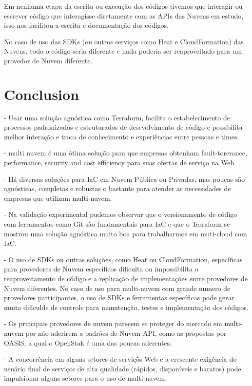 \documentclass[12pt]{article}
\begin{document}
	Em nenhuma etapa da escrita ou execução dos códigos tivemos que interagir ou escrever código que interagisse diretamente com as APIs das Nuvens em estudo, isso nos facilitou a escrita e documentação dos códigos.
	
	No caso de uso das SDKs (ou outros serviços como Heat e CloudFormation) das Nuvens, todo o código seria diferente e nada poderia ser reaproveitado para um provedor de Nuvem diferente. 		
	
	\section{Conclusion}
	
	- Usar uma solução agnóstica como Terraform, facilita o estabelecimento de processos padronizados e estruturados de desevolvimento de código e possibilita melhor interação e troca de conhecimento e experiências entre pessoas e times.
	
	- multi nuvem é uma ótima solução para que empresas obtenham fault-torerance, performance, security and cost efficiency para suas ofertas de serviço na Web.
	
	- Há diversas soluções para IaC em Nuvem Pública ou Privadas, mas poucas são agnósticas, completas e robustas o bastante para atender as necessidades de empresas que utilizam multi-nuvem.
	
	- Na validação experimental pudemos observar que o versionamento de código com ferramentas como Git são fundamentais para IaC e que o Terraform se mostrou uma solução agnóstica muito boa para trabalharmos em muti-cloud com IaC.
	
	- O uso de SDKs ou outras soluções, como Heat ou CloudFormation, específicas para provedores de Nuvem específicos dificulta ou impossibilita o reaproveitamento de código e a replicação de implementações entre provedores de Nuvem diferentes. No caso de uso para multi-nuvem com grande numero de provedores participantes, o uso de SDKs e ferramentas específicas pode gerar muita dificulde de controle para manutenção, testes e implementação dos códigos.
	
	- Os principais provedores de nuvem parecem se proteger do mercado em multi-nuvem por não aderirem a padrões de Nuvem API, como as propostas por OASIS, a qual o OpenStak é uma das poucas aderentes.
	
	- A concorrência em alguns setores de serviçõs Web e a crescente exigência do usuário final de serviços de alta qualidade (rápidos, disponíveis e baratos) pode impulsionar alguns setores para o uso de multi-nuvem.	
	
\end{document}
